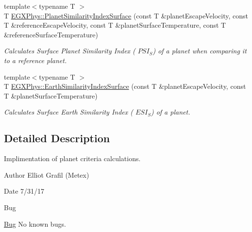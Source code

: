 \begin{DoxyCompactItemize}
{\footnotesize template$<$typename T $>$ }\\T \hyperlink{group___astrophysics_gae0c7dce2779d66b0560ca388a34ddc39}{E\+G\+X\+Phys\+::\+Planet\+Similarity\+Index\+Surface} (const T \&planet\+Escape\+Velocity, const T \&reference\+Escape\+Velocity, const T \&planet\+Surface\+Temperature, const T \&reference\+Surface\+Temperature)
\begin{DoxyCompactList}\small\item\em Calculates Surface Planet Similarity Index ( $PSI_S$) of a planet when comparing it to a reference planet. \end{DoxyCompactList}\item 
{\footnotesize template$<$typename T $>$ }\\T \hyperlink{group___astrophysics_ga1df772b0ed354ca7f7e4a7a4af072325}{E\+G\+X\+Phys\+::\+Earth\+Similarity\+Index\+Surface} (const T \&planet\+Escape\+Velocity, const T \&planet\+Surface\+Temperature)
\begin{DoxyCompactList}\small\item\em Calculates Surface Earth Similarity Index ( $ESI_S$) of a planet. \end{DoxyCompactList}\end{DoxyCompactItemize}


\subsection{Detailed Description}
Implimentation of planet criteria calculations. 

\begin{DoxyAuthor}{Author}
Elliot Grafil (Metex) 
\end{DoxyAuthor}
\begin{DoxyDate}{Date}
7/31/17 
\end{DoxyDate}
\begin{DoxyRefDesc}{Bug}
\item[\hyperlink{bug__bug000016}{Bug}]No known bugs. \end{DoxyRefDesc}
